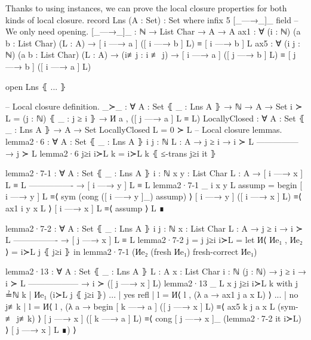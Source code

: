 \documentclass[logo,bsc,singlespacing,parskip,online]{infthesis}
\renewenvironment{code}{\mintedcopy[breaklines,breaksymbolleft=\;]{agda}}{\endmintedcopy}
\begin{document}
Thanks to using instances, we can prove the local closure properties for both kinds of local
closure.
\begin{code}
  record Lns (A : Set) : Set where
    infix 5 [_—→_]_
    field
      -- We only need opening.
      [_—→_]_ : ℕ → List Char → A → A
      ax1 : ∀ (i : ℕ) (a b : List Char) (L : A)
        → [ i —→ a ] ([ i —→ b ] L) ≡ [ i —→ b ] L
      ax5 : ∀ (i j : ℕ) (a b : List Char) (L : A)
        → (i≢j : i ≢ j)
        → [ i —→ a ] ([ j —→ b ] L) ≡ [ j —→ b ] ([ i —→ a ] L)

  open Lns ⦃ ... ⦄

  
  -- Local closure definition.
  _≻_ : ∀ {A : Set} ⦃ _ : Lns A ⦄ → ℕ → A → Set
  i ≻ L = (j : ℕ) ⦃ _ : j ≥ i ⦄ → И a , ([ j —→ a ] L ≡ L)
  LocallyClosed : ∀ {A : Set} ⦃ _ : Lns A ⦄ → A → Set
  LocallyClosed L = 0 ≻ L
  -- Local closure lemmas.
  lemma2·6 : ∀ {A : Set} ⦃ _ : Lns A ⦄ {i j : ℕ} {L : A}
    → j ≥ i   → i ≻ L
      ---------------
    → j ≻ L
  lemma2·6 j≥i i≻L k = i≻L k ⦃ ≤-trans j≥i it ⦄

  lemma2·7-1 : ∀ {A : Set} ⦃ _ : Lns A ⦄ {i : ℕ} {x y : List Char} {L : A}
    → [ i —→ x ] L ≡ L
      ----------------
    → [ i —→ y ] L ≡ L
  lemma2·7-1 {_} {i} {x} {y} {L} assump =
    begin
      [ i —→ y ] L
    ≡⟨ sym (cong ([ i —→ y ]_) assump) ⟩
      [ i —→ y ] ([ i —→ x ] L)
    ≡⟨ ax1 i y x L ⟩
      [ i —→ x ] L
    ≡⟨ assump ⟩
      L
    ∎

  lemma2·7-2 : ∀ {A : Set} ⦃ _ : Lns A ⦄ {i j : ℕ} {x : List Char} {L : A}
    → j ≥ i → i ≻ L
      ----------------
    → [ j —→ x ] L ≡ L
  lemma2·7-2 {j = j} j≥i i≻L =
    let И⟨ Иe₁ , Иe₂ ⟩ = i≻L j ⦃ j≥i ⦄ in
      lemma2·7-1 (Иe₂ (fresh Иe₁) {fresh-correct Иe₁})

  lemma2·13 : ∀ {A : Set} ⦃ _ : Lns A ⦄ {L : A} {x : List Char} {i : ℕ} (j : ℕ)
    → j ≥ i      → i ≻ L
      ------------------
    → i ≻ ([ j —→ x ] L)
  lemma2·13 {_} {L} {x} j j≥i i≻L k
    with j ≟ℕ k | Иe₁ (i≻L j ⦃ j≥i ⦄)
  ... | yes refl | l = И⟨ l , (λ a → ax1 j a x L) ⟩
  ... | no  j≢k  | l = И⟨ l , (λ a → 
    begin
      [ k —→ a ] ([ j —→ x ] L)
    ≡⟨ ax5 k j a x L (sym-≢ j≢k) ⟩
      [ j —→ x ] ([ k —→ a ] L)
    ≡⟨ cong [ j —→ x ]_ (lemma2·7-2 it i≻L) ⟩
      [ j —→ x ] L
    ∎) ⟩


\end{code}
\end{document}
